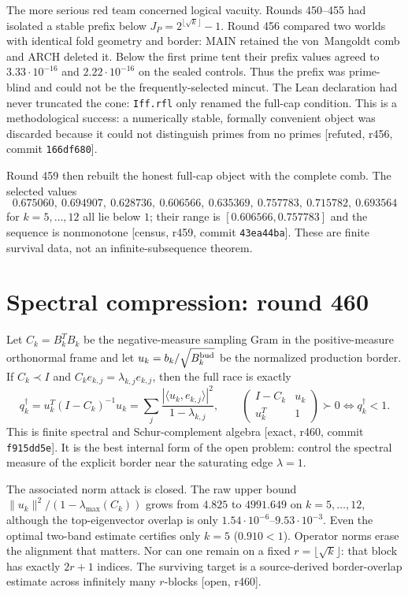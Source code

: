 \documentclass[11pt]{article}
\theoremstyle{remark}
\newcommand{\gr}[1]{\textnormal{\small[#1]}}
\begin{document}
The more serious red team concerned logical vacuity.  Rounds
450--455 had isolated a stable prefix below
$J_{P}=2^{\lfloor\sqrt{k}\rfloor}-1$.  Round 456 compared two worlds
with identical fold geometry and border: MAIN retained the
von~Mangoldt comb and ARCH deleted it.  Below the first prime tent
their prefix values agreed to $3.33\cdot10^{-16}$ and
$2.22\cdot10^{-16}$ on the sealed controls.  Thus the prefix was
prime-blind and could not be the frequently-selected mincut.
The Lean declaration had never truncated the cone:
\texttt{Iff.rfl} only renamed the full-cap condition.  This is a
methodological success: a numerically stable, formally convenient
object was discarded because it could not distinguish primes from
no primes \gr{refuted, r456, commit \texttt{166df680}}.

Round 459 then rebuilt the honest full-cap object with the complete
comb.  The selected values
\[
0.675060,\ 0.694907,\ 0.628736,\ 0.606566,\
0.635369,\ 0.757783,\ 0.715782,\ 0.693564
\]
for $k=5,\ldots,12$ all lie below $1$; their range is
$[0.606566,0.757783]$ and the sequence is nonmonotone
\gr{census, r459, commit \texttt{43ea44ba}}.  These are finite
survival data, not an infinite-subsequence theorem.

\section{Spectral compression: round 460}\label{sec:r460}

Let $C_{k}=B_{k}^{T}B_{k}$ be the negative-measure sampling Gram
in the positive-measure orthonormal frame and let
$u_{k}=b_{k}/\sqrt{B_{k}^{\rm bud}}$ be the normalized production
border.  If $C_{k}\prec I$ and
$C_{k}e_{k,j}=\lambda_{k,j}e_{k,j}$, then the full race is exactly
\begin{equation}\label{eq:r460spectral}
 q_{k}^{\dagger}
 =u_{k}^{T}(I-C_{k})^{-1}u_{k}
 =\sum_{j}\frac{|\langle u_{k},e_{k,j}\rangle|^{2}}
                    {1-\lambda_{k,j}},
\qquad
\begin{pmatrix}I-C_{k}&u_{k}\\u_{k}^{T}&1\end{pmatrix}\succ0
\iff q_{k}^{\dagger}<1 .
\end{equation}
This is finite spectral and Schur-complement algebra
\gr{exact, r460, commit \texttt{f915dd5e}}.  It is the best internal
form of the open problem: control the spectral measure of the
explicit border near the saturating edge $\lambda=1$.

The associated norm attack is closed.  The raw upper bound
$\|u_{k}\|^{2}/(1-\lambda_{\max}(C_{k}))$ grows from $4.825$ to
$4991.649$ on $k=5,\ldots,12$, although the top-eigenvector overlap
is only $1.54\cdot10^{-6}$--$9.53\cdot10^{-3}$.  Even the optimal
two-band estimate certifies only $k=5$ ($0.910<1$).  Operator norms
erase the alignment that matters.  Nor can one remain on a fixed
$r=\lfloor\sqrt{k}\rfloor$: that block has exactly $2r+1$ indices.
The surviving target is a source-derived border-overlap estimate
across infinitely many $r$-blocks \gr{open, r460}.
\end{document}
